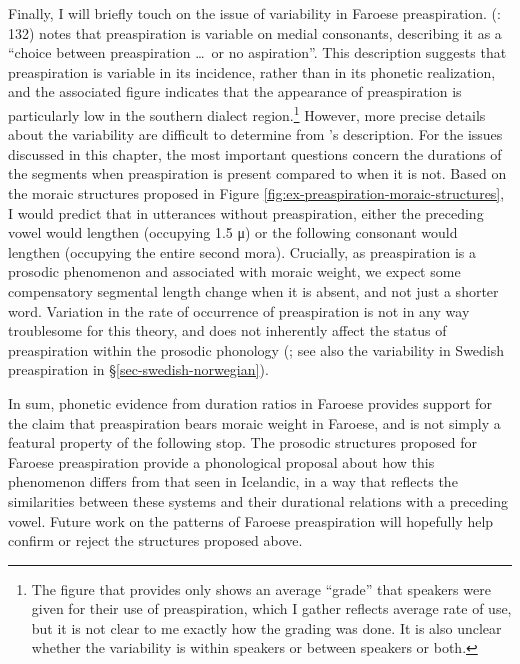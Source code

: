 \documentclass[output=paper,colorlinks,citecolor=brown]{langscibook}
\begin{document}
Finally, I will briefly touch on the issue of variability in Faroese preaspiration. {\citeauthor{arnason2015}} (\citeyear{arnason2015}: 132) notes that preaspiration is variable on medial consonants, describing it as a ``choice between preaspiration \ldots\ or no aspiration''. This description suggests that preaspiration is variable in its incidence, rather than in its phonetic realization, and the associated figure indicates that the appearance of preaspiration is particularly low in the southern dialect region.\footnote{The figure that \citet{arnason2015} provides only shows an average ``grade'' that speakers were given for their use of preaspiration, which I gather reflects average rate of use, but it is not clear to me exactly how the grading was done. It is also unclear whether the variability is within speakers or between speakers or both.} However, more precise details about the variability are difficult to determine from \citeauthor{arnason2015}'s description. For the issues discussed in this chapter, the most important questions concern the durations of the segments when preaspiration is present compared to when it is not. Based on the moraic structures proposed in Figure \ref{fig:ex-preaspiration-moraic-structures}, I would predict that in utterances without preaspiration, either the preceding vowel would lengthen (occupying 1.5 μ) or the following consonant would lengthen (occupying the entire second mora). Crucially, as preaspiration is a prosodic phenomenon and associated with moraic weight, we expect some compensatory segmental length change when it is absent, and not just a shorter word. Variation in the rate of occurrence of preaspiration is not in any way troublesome for this theory, and does not inherently affect the status of preaspiration within the prosodic phonology (\citealp{iosad2017-mfm,hejna2019}; see also the variability in Swedish preaspiration in \S\ref{sec-swedish-norwegian}).

In sum, phonetic evidence from duration ratios in Faroese provides support for the claim that preaspiration bears moraic weight in Faroese, and is not simply a featural property of the following stop. The prosodic structures proposed for Faroese preaspiration provide a phonological proposal about how this phenomenon differs from that seen in Icelandic, in a way that reflects the similarities between these systems and their durational relations with a preceding vowel. Future work on the patterns of Faroese preaspiration will hopefully help confirm or reject the structures proposed above.
\end{document}
